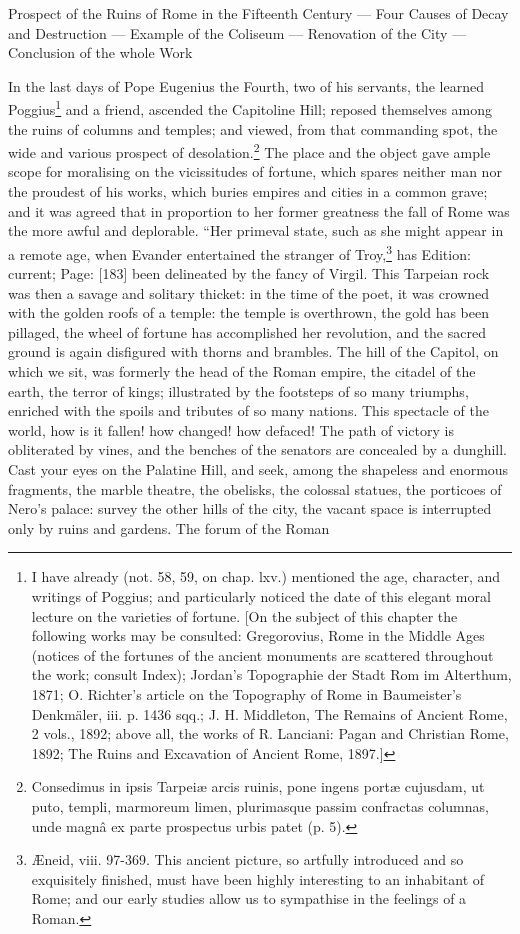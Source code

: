 Prospect of the Ruins of Rome in the Fifteenth Century \texthebrew{—} Four Causes of Decay and Destruction \texthebrew{—} Example of the Coliseum \texthebrew{—} Renovation of the City \texthebrew{—} Conclusion of the whole Work

In the last days of Pope Eugenius the Fourth, two of his servants, the learned Poggius\footnote{I have already (not. 58, 59, on chap. lxv.) mentioned the age, character, and writings of Poggius; and particularly noticed the date of this elegant moral lecture on the varieties of fortune. [On the subject of this chapter the following works may be consulted: Gregorovius, Rome in the Middle Ages (notices of the fortunes of the ancient monuments are scattered throughout the work; consult Index); Jordan\texthebrew{}’s Topographie der Stadt Rom im Alterthum, 1871; O. Richter\texthebrew{}’s article on the Topography of Rome in Baumeister\texthebrew{}’s Denkmäler, iii. p. 1436 sqq.; J. H. Middleton, The Remains of Ancient Rome, 2 vols., 1892; above all, the works of R. Lanciani: Pagan and Christian Rome, 1892; The Ruins and Excavation of Ancient Rome, 1897.]} and a friend, ascended the Capitoline Hill; reposed themselves among the ruins of columns and temples; and viewed, from that commanding spot, the wide and various prospect of desolation.\footnote{Consedimus in ipsis Tarpeiæ arcis ruinis, pone ingens portæ cujusdam, ut puto, templi, marmoreum limen, plurimasque passim confractas columnas, unde magnâ ex parte prospectus urbis patet (p. 5).} The place and the object gave ample scope for moralising on the vicissitudes of fortune, which spares neither man nor the proudest of his works, which buries empires and cities in a common grave; and it was agreed that in proportion to her former greatness the fall of Rome was the more awful and deplorable. \texthebrew{“}Her primeval state, such as she might appear in a remote age, when Evander entertained the stranger of Troy,\footnote{Æneid, viii. 97-369. This ancient picture, so artfully introduced and so exquisitely finished, must have been highly interesting to an inhabitant of Rome; and our early studies allow us to sympathise in the feelings of a Roman.} has Edition: current; Page: [183] been delineated by the fancy of Virgil. This Tarpeian rock was then a savage and solitary thicket: in the time of the poet, it was crowned with the golden roofs of a temple: the temple is overthrown, the gold has been pillaged, the wheel of fortune has accomplished her revolution, and the sacred ground is again disfigured with thorns and brambles. The hill of the Capitol, on which we sit, was formerly the head of the Roman empire, the citadel of the earth, the terror of kings; illustrated by the footsteps of so many triumphs, enriched with the spoils and tributes of so many nations. This spectacle of the world, how is it fallen! how changed! how defaced! The path of victory is obliterated by vines, and the benches of the senators are concealed by a dunghill. Cast your eyes on the Palatine Hill, and seek, among the shapeless and enormous fragments, the marble theatre, the obelisks, the colossal statues, the porticoes of Nero\texthebrew{}’s palace: survey the other hills of the city, the vacant space is interrupted only by ruins and gardens. The forum of the Roman 